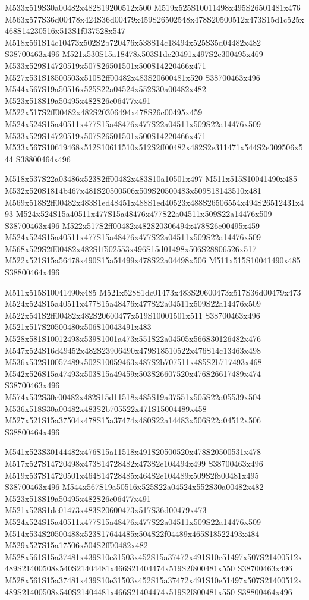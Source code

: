 \documentclass{article}
\begin{document}
\begin{multicols}{2}
M533x519S30a00482x482S19200512x500 M519x525S10011498x495S26501481x476 M563x577S36d00478x424S36d00479x459S26502548x478S20500512x473S15d1c525x468S14230516x513S1f037528x547 M518x561S14c10473x502S2b720476x538S14c18494x525S35d04482x482 S38700463x496 M521x530S15a18478x503S1dc20491x497S2c300495x469 M533x529S14720519x507S26501501x500S14220466x471 M527x531S18500503x510S2ff00482x483S20600481x520 S38700463x496 M544x567S19a50516x525S22a04524x552S30a00482x482 M523x518S19a50495x482S26c06477x491 M522x517S2ff00482x482S20306494x478S26c00495x459 M524x524S15a40511x477S15a48476x477S22a04511x509S22a14476x509 M533x529S14720519x507S26501501x500S14220466x471 M533x567S10619468x512S10611510x512S2ff00482x482S2e311471x544S2e309506x544 S38800464x496

M518x537S22a03486x523S2ff00482x483S10a10501x497 M511x515S10041490x485 M532x520S1814b467x481S20500506x509S20500483x509S18143510x481 M569x518S2ff00482x483S1ed48451x488S1ed40523x488S26506554x494S26512431x493 M524x524S15a40511x477S15a48476x477S22a04511x509S22a14476x509 S38700463x496 M522x517S2ff00482x482S20306494x478S26c00495x459 M524x524S15a40511x477S15a48476x477S22a04511x509S22a14476x509 M568x529S2ff00482x482S1f502553x496S15d01498x506S28806526x517 M522x521S15a56478x490S15a51499x478S22a04498x506 M511x515S10041490x485 S38800464x496

M511x515S10041490x485 M521x528S1dc01473x483S20600473x517S36d00479x473 M524x524S15a40511x477S15a48476x477S22a04511x509S22a14476x509 M522x541S2ff00482x482S20600477x519S10001501x511 S38700463x496 M521x517S20500480x506S10043491x483 M528x581S10012498x539S1001a473x551S22a04505x566S30126482x476 M547x524S16d49452x482S23906490x479S18510522x476S14c13463x498 M536x532S10057489x502S10059463x487S2b707511x485S2b717493x468 M542x526S15a47493x503S15a49459x503S26607520x476S26617489x474 S38700463x496 M574x532S30e00482x482S15d11518x485S19a37551x505S22a05539x504 M536x518S30a00482x483S2b705522x471S15004489x458 M527x521S15a37504x478S15a37474x480S22a14483x506S22a04512x506 S38800464x496

M541x523S30144482x476S15a11518x491S20500520x478S20500531x478 M517x527S14720498x473S14728482x473S2e104494x499 S38700463x496 M519x537S14720501x464S14728485x464S2e104489x509S2f800481x495 S38700463x496 M544x567S19a50516x525S22a04524x552S30a00482x482 M523x518S19a50495x482S26c06477x491 M521x528S1dc01473x483S20600473x517S36d00479x473 M524x524S15a40511x477S15a48476x477S22a04511x509S22a14476x509 M514x534S20500488x523S17644485x504S22f04489x465S18522493x484 M529x527S15a17506x504S2ff00482x482 M528x561S15a37481x439S10e31503x452S15a37472x491S10e51497x507S21400512x489S21400508x540S21404481x466S21404474x519S2f800481x550 S38700463x496 M528x561S15a37481x439S10e31503x452S15a37472x491S10e51497x507S21400512x489S21400508x540S21404481x466S21404474x519S2f800481x550 S38800464x496


\end{multicols}
\end{document}
